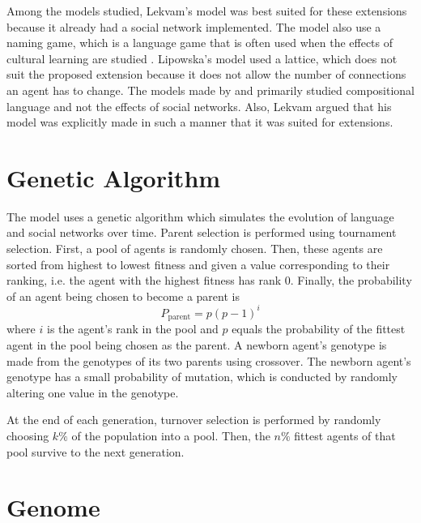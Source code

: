 Among the models studied, Lekvam’s model was best suited for these extensions because it already had a social network implemented. The model also use a naming game, which is a language game that is often used when the effects of cultural learning are studied \citep{lekvam2014co, lipowska2011naming, steels2011modeling}. Lipowska’s model used a lattice, which does not suit the proposed extension because it does not allow the number of connections an agent has to change. The models made by \citeauthor{gong2011simulating} and \citeauthor{munroe2002learning} primarily studied compositional language and not the effects of social networks. Also, Lekvam argued that his model was explicitly made in such a manner that it was suited for extensions.

\section{Genetic Algorithm}

The model uses a genetic algorithm which simulates the evolution of language and social networks over time. Parent selection is performed using tournament selection. First, a pool of agents is randomly chosen. Then, these agents are sorted from highest to lowest fitness and given a value corresponding to their ranking, i.e. the agent with the highest fitness has rank 0. Finally, the probability of an agent being chosen to become a parent is
\begin{equation}
    \label{eq:TSelect}
    P_{\mathrm{parent}} = p(p-1)^{i}
\end{equation}
where $i$ is the agent's rank in the pool and $p$ equals the probability of the fittest agent in the pool being chosen as the parent. A newborn agent's genotype is made from the genotypes of its two parents using crossover. The newborn agent's genotype has a small probability of mutation, which is conducted by randomly altering one value in the genotype.

At the end of each generation, turnover selection is performed by randomly choosing $k\%$ of the population into a pool. Then, the $n\%$ fittest agents of that pool survive to the next generation.

\section{Genome}

